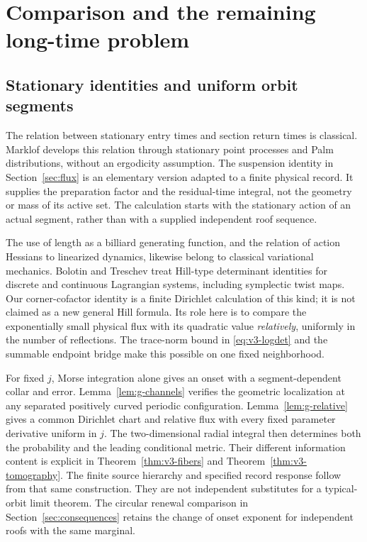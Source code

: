 \section{Comparison and the remaining long-time problem}
\label{sec:comparison}
\subsection{Stationary identities and uniform orbit segments}
The relation between stationary entry times and section return times is
classical. Marklof \cite{Marklof} develops this relation through stationary
point processes and Palm distributions, without an ergodicity assumption.
The suspension identity in Section~\ref{sec:flux} is an elementary version
adapted to a finite physical record. It supplies the preparation factor
and the residual-time integral, not the geometry or mass of its active set.
The calculation starts with the stationary action of an actual segment,
rather than with a supplied independent roof sequence.

The use of length as a billiard generating function, and the relation of
action Hessians to linearized dynamics, likewise belong to classical
variational mechanics. Bolotin and Treschev \cite{Hill} treat Hill-type
determinant identities for discrete and continuous Lagrangian systems,
including symplectic twist maps. Our corner-cofactor identity is a finite
Dirichlet calculation of this kind; it is not claimed as a new general
Hill formula. Its role here is to compare the exponentially small physical
flux with its quadratic value \emph{relatively}, uniformly in the number
of reflections. The trace-norm bound in \eqref{eq:v3-logdet} and the summable
endpoint bridge make this possible on one fixed neighborhood.

For fixed $j$, Morse integration alone gives an onset with a
segment-dependent collar and error. Lemma~\ref{lem:g-channels}
verifies the geometric localization at any separated positively curved
periodic configuration. Lemma~\ref{lem:g-relative} gives a common
Dirichlet chart and relative flux with every fixed parameter derivative
uniform in $j$. The two-dimensional radial integral then determines
both the probability and the leading conditional metric. Their different
information content is explicit in Theorem~\ref{thm:v3-fibers} and
Theorem~\ref{thm:v3-tomography}. The finite source hierarchy and
specified record response follow from that same construction. They
are not independent substitutes for a typical-orbit limit theorem.
The circular renewal comparison in Section~\ref{sec:consequences}
retains the change of onset exponent for independent roofs with the
same marginal.

